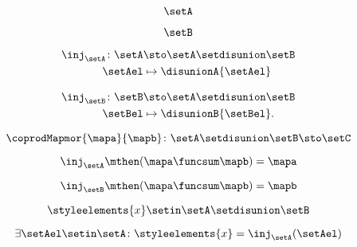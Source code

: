 {\begin{forslides}
    \begin{equation}
        \label{eq:feedback-096}
        \setA
    \end{equation}

    \begin{equation}
        \label{eq:feedback-097}
        \setB
    \end{equation}

    \begin{equation}
        \label{eq:feedback-098}
        \begin{aligned}
            \inj_\setA\colon \setA & \sto \setA\setdisunion\setB \\
            \setAel                & \mapsto \disunionA{\setAel}
        \end{aligned} \end{equation}

    \begin{equation}
        \label{eq:feedback-099}
        \begin{aligned}
            \inj_\setB\colon \setB & \sto \setA\setdisunion\setB \\
            \setBel                & \mapsto \disunionB{\setBel}.
        \end{aligned}    \end{equation}

    \begin{equation}
        \label{eq:feedback-100}
        \coprodMapmor{\mapa}{\mapb}\colon \setA \setdisunion \setB \sto \setC
    \end{equation}

    \begin{equation}
        \label{eq:feedback-101}
        \inj_\setA\mthen (\mapa \funcsum \mapb)=\mapa
    \end{equation}

    \begin{equation}
        \label{eq:feedback-102}
        \inj_\setB\mthen (\mapa \funcsum \mapb)=\mapb
    \end{equation}

    \begin{equation}
        \label{eq:feedback-103}
        \styleelements{x}\setin \setA \setdisunion \setB
    \end{equation}

    \begin{equation}
        \label{eq:feedback-104}
        \exists \setAel\setin \setA\colon \styleelements{x}=\inj_\setA(\setAel)
    \end{equation}


\end{forslides}}
